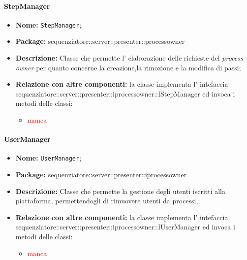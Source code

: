 \paragraph{StepManager}
	\begin{itemize}
		\item \textbf{Nome:} \texttt{StepManager};
		\item \textbf{Package:} sequenziatore::server::presenter::processowner
		\item \textbf{Descrizione:} Classe che permette l' elaborazione delle richieste del \textit{process owner} per quanto concerne la creazione,la rimozione e la modifica di passi;
		\item \textbf{Relazione con altre componenti:} la classe implementa l' intefaccia sequenziatore::server::presenter::iprocessowner::IStepManager ed invoca i metodi delle classi:
		\begin{itemize}
			\item \textcolor{red}{manca}
		\end{itemize}
	\end{itemize}
\paragraph{UserManager}
	\begin{itemize}
		\item \textbf{Nome:} \texttt{UserManager};
		\item \textbf{Package:} sequenziatore::server::presenter::iprocessowner
		\item \textbf{Descrizione:} Classe che permette la gestione degli utenti iscritti alla piattaforma, permettendogli di rimuovere utenti da processi,;
		\item \textbf{Relazione con altre componenti:} la classe implementa l' intefaccia sequenziatore::server::presenter::iprocessowner::IUserManager ed invoca i metodi delle classi:
		\begin{itemize}
			\item \textcolor{red}{manca}
		\end{itemize}
	\end{itemize}


